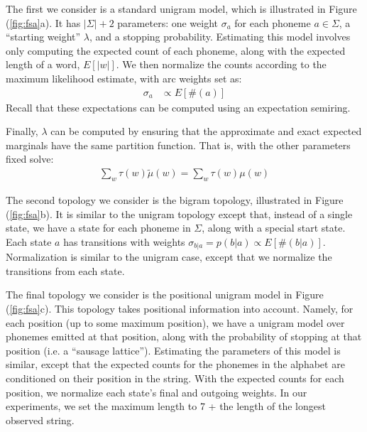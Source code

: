 \documentclass[11pt,a4paper]{article}
\begin{document}
The first we consider is a standard unigram model, which is illustrated
in Figure (\ref{fig:fsa}a). It has $|\Sigma|+2$ parameters: one
weight $\sigma_a$ for each phoneme $a \in \Sigma$, a ``starting
weight'' $\lambda$, and a stopping probability. Estimating this
model involves only computing the expected count of each phoneme,
along with the expected length of a word, $E[|w|]$. We then normalize
the counts according to the maximum likelihood estimate, with arc
weights set as:
\begin{equation*}
  \begin{split}
    \sigma_a &\propto E[\#(a)]
   \end{split}
 \end{equation*}
Recall that these expectations can be computed using an expectation semiring.

Finally, $\lambda$ can be computed by ensuring that the
approximate and exact expected marginals have the same partition
function. That is, with the other parameters fixed solve:
\begin{equation*}
  \begin{split}
    \sum_w \tau(w) \tilde\mu(w) = \sum_w \tau(w) \mu(w)
  \end{split}
\end{equation*}

The second topology we consider is the bigram topology, illustrated
in Figure (\ref{fig:fsa}b). It is similar to the unigram topology
except that, instead of a single state, we have a state for each
phoneme in $\Sigma$, along with a special start state. Each state
$a$ has transitions with weights $\sigma_{b|a}= p(b|a) \propto
E[\#(b|a)]$. Normalization is similar to the unigram case, except
that we normalize the transitions from each state.

The final topology we consider is the positional unigram model in
Figure (\ref{fig:fsa}c). This topology takes positional information
into account. Namely, for each position (up to some maximum position),
we have a unigram model over phonemes emitted at that position,
along with the probability of stopping at that position (i.e. a
``sausage lattice''). Estimating the parameters of this model is
similar, except that the expected counts for the phonemes in the
alphabet are conditioned on their position in the string. With the
expected counts for each position, we normalize each state's final
and outgoing weights. In our experiments, we set the maximum length
to 7 + the length of the longest observed string.
\end{document}
